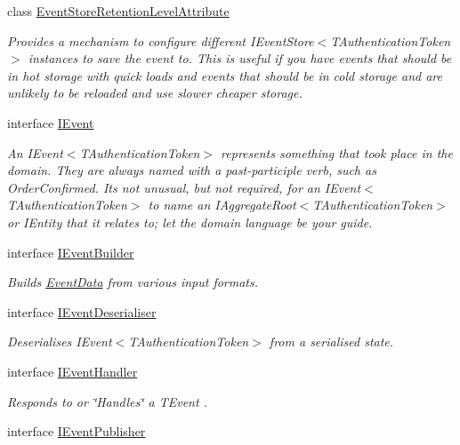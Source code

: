 \begin{DoxyCompactItemize}
class \hyperlink{classCqrs_1_1Events_1_1EventStoreRetentionLevelAttribute}{Event\+Store\+Retention\+Level\+Attribute}
\begin{DoxyCompactList}\small\item\em Provides a mechanism to configure different I\+Event\+Store$<$\+T\+Authentication\+Token$>$ instances to save the event to. This is useful if you have events that should be in hot storage with quick loads and events that should be in cold storage and are unlikely to be reloaded and use slower cheaper storage. \end{DoxyCompactList}\item 
interface \hyperlink{interfaceCqrs_1_1Events_1_1IEvent}{I\+Event}
\begin{DoxyCompactList}\small\item\em An I\+Event$<$\+T\+Authentication\+Token$>$ represents something that took place in the domain. They are always named with a past-\/participle verb, such as Order\+Confirmed. It\textquotesingle{}s not unusual, but not required, for an I\+Event$<$\+T\+Authentication\+Token$>$ to name an I\+Aggregate\+Root$<$\+T\+Authentication\+Token$>$ or I\+Entity that it relates to; let the domain language be your guide. \end{DoxyCompactList}\item 
interface \hyperlink{interfaceCqrs_1_1Events_1_1IEventBuilder}{I\+Event\+Builder}
\begin{DoxyCompactList}\small\item\em Builds \hyperlink{classCqrs_1_1Events_1_1EventData}{Event\+Data} from various input formats. \end{DoxyCompactList}\item 
interface \hyperlink{interfaceCqrs_1_1Events_1_1IEventDeserialiser}{I\+Event\+Deserialiser}
\begin{DoxyCompactList}\small\item\em Deserialises I\+Event$<$\+T\+Authentication\+Token$>$ from a serialised state. \end{DoxyCompactList}\item 
interface \hyperlink{interfaceCqrs_1_1Events_1_1IEventHandler}{I\+Event\+Handler}
\begin{DoxyCompactList}\small\item\em Responds to or \char`\"{}\+Handles\char`\"{} a {\itshape T\+Event} . \end{DoxyCompactList}\item 
interface \hyperlink{interfaceCqrs_1_1Events_1_1IEventPublisher}{I\+Event\+Publisher}

\end{DoxyCompactItemize}
